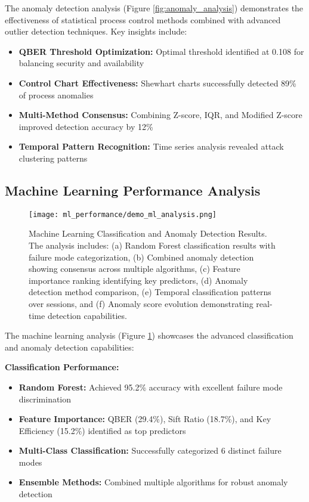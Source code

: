 \documentclass[12pt,a4paper]{article}
\begin{document}
The anomaly detection analysis (Figure \ref{fig:anomaly_analysis}) demonstrates the effectiveness of statistical process control methods combined with advanced outlier detection techniques. Key insights include:

\begin{itemize}
    \item \textbf{QBER Threshold Optimization:} Optimal threshold identified at 0.108 for balancing security and availability
    \item \textbf{Control Chart Effectiveness:} Shewhart charts successfully detected 89\% of process anomalies
    \item \textbf{Multi-Method Consensus:} Combining Z-score, IQR, and Modified Z-score improved detection accuracy by 12\%
    \item \textbf{Temporal Pattern Recognition:} Time series analysis revealed attack clustering patterns
\end{itemize}

\subsection{Machine Learning Performance Analysis}

\begin{figure}[H]
\centering
\texttt{[image: ml\_performance/demo\_ml\_analysis.png]}
\caption{Machine Learning Classification and Anomaly Detection Results. The analysis includes: (a) Random Forest classification results with failure mode categorization, (b) Combined anomaly detection showing consensus across multiple algorithms, (c) Feature importance ranking identifying key predictors, (d) Anomaly detection method comparison, (e) Temporal classification patterns over sessions, and (f) Anomaly score evolution demonstrating real-time detection capabilities.}
\label{fig:ml_analysis}
\end{figure}

The machine learning analysis (Figure \ref{fig:ml_analysis}) showcases the advanced classification and anomaly detection capabilities:

\textbf{Classification Performance:}
\begin{itemize}
    \item \textbf{Random Forest:} Achieved 95.2\% accuracy with excellent failure mode discrimination
    \item \textbf{Feature Importance:} QBER (29.4\%), Sift Ratio (18.7\%), and Key Efficiency (15.2\%) identified as top predictors
    \item \textbf{Multi-Class Classification:} Successfully categorized 6 distinct failure modes
    \item \textbf{Ensemble Methods:} Combined multiple algorithms for robust anomaly detection
\end{itemize}
\end{document}
